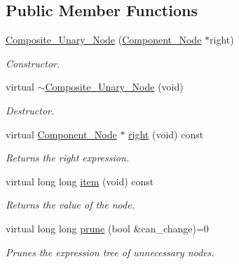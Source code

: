 \subsection*{Public Member Functions}
\begin{DoxyCompactItemize}
\item 
\hyperlink{classMadara_1_1Expression__Tree_1_1Composite__Unary__Node_ac3d3be61c2c8e84affdcf9a07e08b6c0}{Composite\_\-Unary\_\-Node} (\hyperlink{classMadara_1_1Expression__Tree_1_1Component__Node}{Component\_\-Node} $\ast$right)
\begin{DoxyCompactList}\small\item\em Constructor. \item\end{DoxyCompactList}\item 
virtual \hyperlink{classMadara_1_1Expression__Tree_1_1Composite__Unary__Node_a5b7a5d61aca01bef19f99ceaf2ba9c1a}{$\sim$Composite\_\-Unary\_\-Node} (void)
\begin{DoxyCompactList}\small\item\em Destructor. \item\end{DoxyCompactList}\item 
virtual \hyperlink{classMadara_1_1Expression__Tree_1_1Component__Node}{Component\_\-Node} $\ast$ \hyperlink{classMadara_1_1Expression__Tree_1_1Composite__Unary__Node_ade55cde5707e0fa73ab1c019159b9aec}{right} (void) const 
\begin{DoxyCompactList}\small\item\em Returns the right expression. \item\end{DoxyCompactList}\item 
virtual long long \hyperlink{classMadara_1_1Expression__Tree_1_1Component__Node_ac38c35834da00a454c8f876278ad1b99}{item} (void) const 
\begin{DoxyCompactList}\small\item\em Returns the value of the node. \item\end{DoxyCompactList}\item 
virtual long long \hyperlink{classMadara_1_1Expression__Tree_1_1Component__Node_a8833adfc3e79980a90e82a68586f4300}{prune} (bool \&can\_\-change)=0
\begin{DoxyCompactList}\small\item\em Prunes the expression tree of unnecessary nodes. \item\end{DoxyCompactList}\item 

\end{DoxyCompactItemize}
